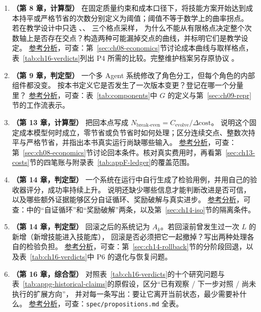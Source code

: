 \begin{enumerate}[label=G\arabic*.]
  \item\label{ex:g12} \textbf{（第 8 章，计算型）}
        在固定质量约束和成本口径下，将技能方案开始达到成本持平或严格节省的次数分别定义为阈值；阈值不等于数学上的曲率拐点。
        若在教学设计中只选 、、 三个格点采样，
        为什么不能从有限格点决定整个次数轴上是否存在交点？构造两种可能漏掉交点的曲线，并标明它们是教学设定。
        \hyperref[sol:g12]{参考分析}，可查：第~\ref{sec:ch08-economics}节讨论成本曲线与取样格点，表~\ref{tab:ch16-verdicts}列出 P4 所需的比较。完整维护档案另存原协议 。

  \item\label{ex:g13} \textbf{（第 9 章，判定型）}
        一个多 Agent 系统修改了角色分工，但每个角色的内部组件都没变。
        按本书定义它是否发生了一次版本变更？登记在哪一个分量里？
        \hyperref[sol:g13]{参考分析}，可查：表~\ref{tab:components}中 $G$ 的定义与第~\ref{sec:ch09-repr}节的工作流表示。

  \item\label{ex:g14} \textbf{（第 13 章，计算型）}
        把回本点写成 $N_{\text{break-even}}=C_{\text{evolve}}/\Delta\text{cost}$。
        说明这个固定成本模型何时成立，零节省或负节省时如何处理；区分连续交点、整数次持平与严格节省，并指出本书真实运行尚缺哪些输入。
        \hyperref[sol:g14]{参考分析}，可查：第~\ref{sec:ch08-economics}节讨论回本条件。核对真实费用时，再看第~\ref{sec:ch13-costs}节的四笔账与附录表~\ref{tab:appF-ledger}的覆盖范围。

  \item\label{ex:g15} \textbf{（第 14 章，判定型）}
        一个系统在运行中自行生成了检验用例，并用自己的验收器评分，成功率持续上升。
        说明还缺少哪些信息才能判断改进是否可信，以及哪些额外证据能够区分自证循环、奖励破解与真实进步。
        \hyperref[sol:g15]{参考分析}，可查：中的“自证循环”和“奖励破解”两条，以及第~\ref{sec:ch14-iso}节的隔离条件。

  \item\label{ex:g16} \textbf{（第 14 章，判定型）}
        回滚之后的系统记为 $A_{k}$。若回滚前曾发生过一次 $L$ 的新增（新增技能进入技能库），
        回滚是否必须把它一起撤掉？写出两种处理各自的检验负担。
        \hyperref[sol:g16]{参考分析}，可查：第~\ref{sec:ch14-rollback}节的分阶段回退，以及表~\ref{tab:ch16-verdicts}中 P6 的退化与恢复问题。

  \item\label{ex:g17} \textbf{（第 16 章，综合型）}
        对照表~\ref{tab:ch16-verdicts}的十个研究问题与表~\ref{tab:appg-historical-claims}的原假设，区分“已有观察 / 下一步对照 / 尚未执行的扩展方向”，
        并对每一条写出：要让它离开当前状态，最少需要补什么。
        \hyperref[sol:g17]{参考分析}，可查：\texttt{spec/propositions.md} 全表。


\end{enumerate}
